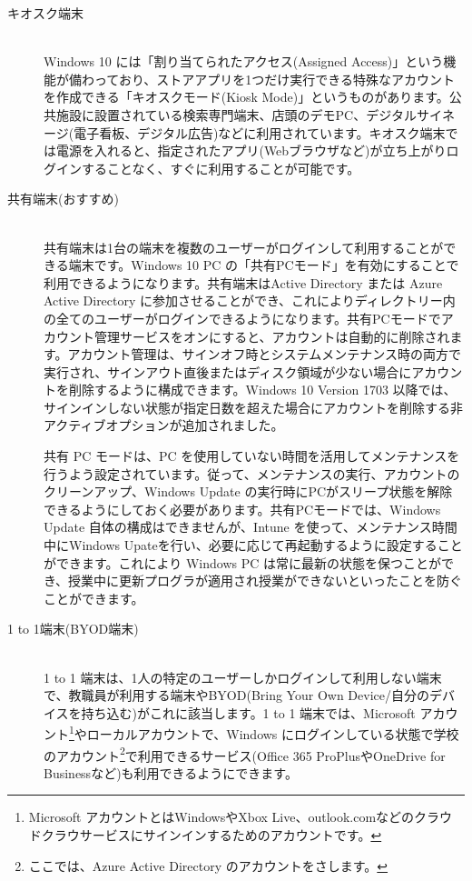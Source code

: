 \begin{description}
    \item[キオスク端末]\mbox{}\\
    Windows 10 には「割り当てられたアクセス(Assigned Access)」という機能が備わっており、ストアアプリを1つだけ実行できる特殊なアカウントを作成できる「キオスクモード(Kiosk Mode)」というものがあります。公共施設に設置されている検索専門端末、店頭のデモPC、デジタルサイネージ(電子看板、デジタル広告)などに利用されています。キオスク端末では電源を入れると、指定されたアプリ(Webブラウザなど)が立ち上がりログインすることなく、すぐに利用することが可能です。
    \item[共有端末(おすすめ)] \mbox{}\\
    共有端末は1台の端末を複数のユーザーがログインして利用することができる端末です。Windows 10 PC の「共有PCモード」を有効にすることで利用できるようになります。共有端末はActive Directory または Azure Active Directory に参加させることができ、これによりディレクトリー内の全てのユーザーがログインできるようになります。共有PCモードでアカウント管理サービスをオンにすると、アカウントは自動的に削除されます。アカウント管理は、サインオフ時とシステムメンテナンス時の両方で実行され、サインアウト直後またはディスク領域が少ない場合にアカウントを削除するように構成できます。Windows 10 Version 1703 以降では、サインインしない状態が指定日数を超えた場合にアカウントを削除する非アクティブオプションが追加されました。

    共有 PC モードは、PC を使用していない時間を活用してメンテナンスを行うよう設定されています。従って、メンテナンスの実行、アカウントのクリーンアップ、Windows Update の実行時にPCがスリープ状態を解除できるようにしておく必要があります。共有PCモードでは、Windows Update 自体の構成はできませんが、Intune を使って、メンテナンス時間中にWindows Upateを行い、必要に応じて再起動するように設定することができます。これにより Windows PC は常に最新の状態を保つことができ、授業中に更新プログラが適用され授業ができないといったことを防ぐことができます。
    \item[1 to 1端末(BYOD端末)] \mbox{}\\
    1 to 1 端末は、1人の特定のユーザーしかログインして利用しない端末で、教職員が利用する端末やBYOD(Bring Your Own Device/自分のデバイスを持ち込む)がこれに該当します。1 to 1 端末では、Microsoft アカウント\footnote{Microsoft アカウントとはWindowsやXbox Live、outlook.comなどのクラウドクラウサービスにサインインするためのアカウントです。}やローカルアカウントで、Windows にログインしている状態で学校のアカウント\footnote{ここでは、Azure Active Directory のアカウントをさします。}で利用できるサービス(Office 365 ProPlusやOneDrive for Businessなど)も利用できるようにできます。
\end{description}

